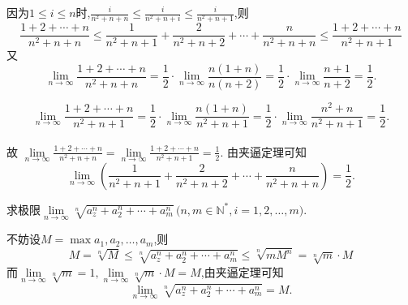 \solve 因为$1 \le i \le n$时,$\displaystyle \frac{i}{n^2+n+n}\le\frac{i}{n^2+n+i}\le \frac{i}{n^2+n+1}$,则
\[
\frac{1+2+\cdots+n}{n^2+n+n}\le \frac{1}{n^2+n+1}+\frac{2}{n^2+n+2}+\cdots+\frac{n}{n^2+n+n} \le \frac{1+2+\cdots+n}{n^2+n+1}
\]
又
\[
\lim\limits_{n \to \infty}\frac{1+2+\cdots +n}{n^2+n+n}=\frac 12 \cdot \lim\limits_{n \to \infty}\frac{n(1+n)}{n(n+2)}=\frac 12 \cdot \lim\limits_{n \to \infty}\frac{n+1}{n+2}=\frac{1}{2}.
\]

\[
\lim\limits_{n \to \infty}\frac{1+2+\cdots +n}{n^2+n+1}=\frac 12 \cdot \lim\limits_{n \to \infty}\frac{n(1+n)}{n^2+n+1}=\frac 12 \cdot \lim\limits_{n \to \infty}\frac{n^2+n}{n^2+n+1}=\frac{1}{2}.
\]
\\
故
$
\displaystyle \lim\limits_{n \to \infty}\frac{1+2+\cdots +n}{n^2+n+n}=\lim\limits_{n \to \infty}\frac{1+2+\cdots +n}{n^2+n+1}=\frac 12.
$
由夹逼定理可知
\[
\lim\limits_{n \to \infty}\left(\frac{1}{n^2+n+1}+\frac{2}{n^2+n+2}+\cdots+\frac{n}{n^2+n+n}\right)=\frac 12.
\]

\vspace*{-1.5em}

\examples 求极限$\lim\limits_{n \to \infty}\sqrt[n]{a_z^n+a_2^n+\cdots+a_m^n}\,\big(n,m \in \mathbb{N}^*,i=1,2,\ldots,m \big)$.

\solve 不妨设$M=\max{a_1,a_2,\ldots,a_m}$,则
\[
M=\sqrt[n]{M}\le \sqrt[n]{a_z^n+a_2^n+\cdots+a_m^n} \le \sqrt[n]{mM^n}=\sqrt[n]{m}\cdot M
\]
而$\lim\limits_{n \to \infty}\sqrt[n]{m}=1,\lim\limits_{n \to \infty }\sqrt[n]{m}\cdot M=M$,由夹逼定理可知
\[
\lim\limits_{n \to \infty}\sqrt[n]{a_z^n+a_2^n+\cdots+a_m^n}=M.
\]

